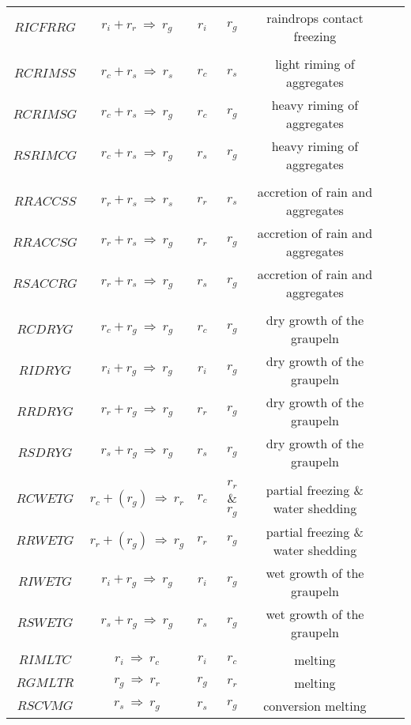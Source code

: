 \begin{table}[!ht]
\begin{center}
\begin{tabular}{|c|c|c|c|c|c|c|}
$RICFRRG$ & $r_i+r_r\ \Longrightarrow \ r_g$ & $r_i$ & $r_g$ & raindrops contact freezing \\
 & & & & \\
$RCRIMSS$ & $r_c+r_s\ \Longrightarrow \ r_s$ & $r_c$ & $r_s$ & light riming of aggregates \\
$RCRIMSG$ & $r_c+r_s\ \Longrightarrow \ r_g$ & $r_c$ & $r_g$ & heavy riming of aggregates \\
$RSRIMCG$ & $r_c+r_s\ \Longrightarrow \ r_g$ & $r_s$ & $r_g$ & heavy riming of aggregates \\
 & & & & \\
$RRACCSS$ & $r_r+r_s\ \Longrightarrow \ r_s$ & $r_r$ & $r_s$ & accretion of rain and aggregates \\
$RRACCSG$ & $r_r+r_s\ \Longrightarrow \ r_g$ & $r_r$ & $r_g$ & accretion of rain and aggregates \\
$RSACCRG$ & $r_r+r_s\ \Longrightarrow \ r_g$ & $r_s$ & $r_g$ & accretion of rain and aggregates \\
 & & & & \\
$RCDRYG$ & $r_c+r_g\ \Longrightarrow \ r_g$ & $r_c$ & $r_g$ & dry growth of the graupeln \\
$RIDRYG$ & $r_i+r_g\ \Longrightarrow \ r_g$ & $r_i$ & $r_g$ & dry growth of the graupeln \\
$RRDRYG$ & $r_r+r_g\ \Longrightarrow \ r_g$ & $r_r$ & $r_g$ & dry growth of the graupeln \\
$RSDRYG$ & $r_s+r_g\ \Longrightarrow \ r_g$ & $r_s$ & $r_g$ & dry growth of the graupeln \\
 & & & & \\
$RCWETG$ & $r_c+(r_g)\ \Longrightarrow \ r_r$ & $r_c$ & $r_r$ \& $r_g$ & partial freezing \& water shedding \\
$RRWETG$ & $r_r+(r_g)\ \Longrightarrow \ r_g$ & $r_r$ & $r_g$ & partial freezing
\& water shedding \\
$RIWETG$ & $r_i+r_g\ \Longrightarrow \ r_g$ & $r_i$ & $r_g$ & wet growth of the graupeln \\
$RSWETG$ & $r_s+r_g\ \Longrightarrow \ r_g$ & $r_s$ & $r_g$ & wet growth of the graupeln \\
 & & & & \\
$RIMLTC$ & $r_i\ \Longrightarrow \ r_c$ & $r_i$ & $r_c$ & melting \\
$RGMLTR$ & $r_g\ \Longrightarrow \ r_r$ & $r_g$ & $r_r$ & melting \\
$RSCVMG$ & $r_s\ \Longrightarrow \ r_g$ & $r_s$ & $r_g$ & conversion melting \\
\hline
\end{tabular}
\end{center}
\end{table}

